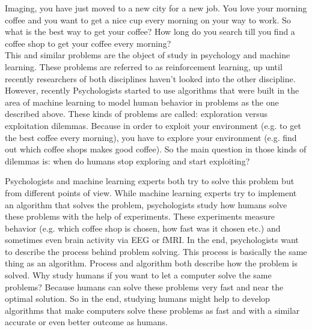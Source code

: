 Imaging, you have just moved to a new city for a new job. You love your morning coffee and you want to get a nice cup every morning on your way to work. So what is the best way to get your coffee? How long do you search till you find a coffee shop to get your coffee every morning? \\ %
This and similar problems are the object of study in psychology and machine learning. These problems are referred to as reinforcement learning, up until recently researchers of both disciplines haven’t looked into the other discipline. %
However, recently Psychologists started to use algorithms that were built in the area of machine learning to model human behavior in problems as the one described above. These kinds of problems are called: exploration versus exploitation dilemmas. %
Because in order to exploit your environment (e.g. to get the best coffee every morning), you have to explore your environment (e.g. find out which coffee shops makes good coffee). So the main question in those kinds of dilemmas is: when do humans stop exploring and start exploiting? 

Psychologists and machine learning experts both try to solve this problem but from different points of view. While machine learning experts try to implement an algorithm that solves the problem, psychologists study how humans solve these problems with the help of experiments. These experiments measure behavior (e.g. which coffee shop is chosen, how fast was it chosen etc.) and sometimes even brain activity via EEG or fMRI. In the end, psychologists want to describe the process behind problem solving. This process is basically the same thing as an algorithm. Process and algorithm both describe how the problem is solved. Why study humans if you want to let a computer solve the same problems? Because humans can solve these problems very fast and near the optimal solution. So in the end, studying humans might help to develop algorithms that make computers solve these problems as fast and with a similar accurate or even better outcome as humans.

